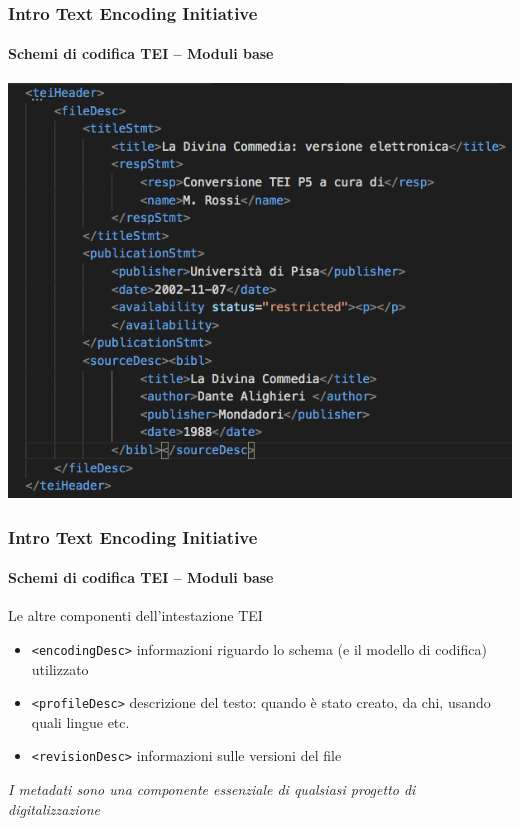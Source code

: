 \begin{frame}
	\frametitle{Intro Text Encoding Initiative}
	\framesubtitle{Schemi di codifica TEI – Moduli base}
	\addtocounter{nframe}{1}

	\begin{center}
		\includegraphics[width=.8\textwidth]{imgs/header2.png}
	\end{center}
	

\end{frame}



\begin{frame}
	\frametitle{Intro Text Encoding Initiative}
	\framesubtitle{Schemi di codifica TEI – Moduli base}
	\addtocounter{nframe}{1}

    \begin{block}{Le altre componenti dell’intestazione TEI}
        \begin{itemize}
            \item \texttt{<encodingDesc>} informazioni riguardo lo schema (e il
            modello di codifica) utilizzato
            \item  \texttt{<profileDesc>} descrizione del testo: quando è stato
            creato, da chi, usando quali lingue etc.
            \item \texttt{<revisionDesc>} informazioni sulle versioni del file
        \end{itemize}
    \end{block}
    \textit{I metadati sono una componente essenziale di qualsiasi
        progetto di digitalizzazione}
\end{frame}


